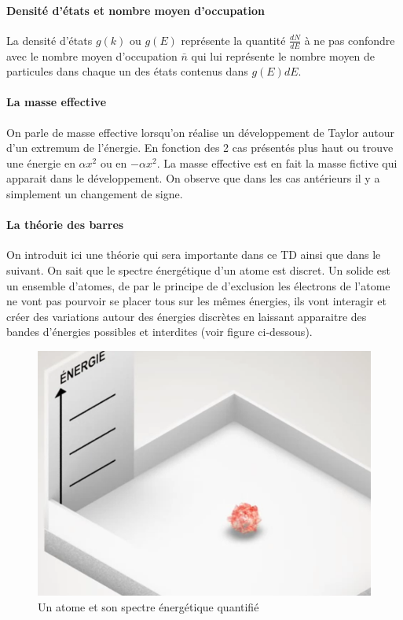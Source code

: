 \paragraph{Densité d'états et nombre moyen d'occupation}

La densité d'états $g(k)$ ou $g(E)$ représente la quantité $\frac{dN}{dE}$ à ne pas confondre avec le nombre moyen d'occupation $\bar{n}$ qui lui représente le nombre moyen de particules dans chaque un des états contenus dans $g(E)dE$.


\paragraph{La masse effective}

On parle de masse effective lorsqu'on réalise un développement de Taylor autour d'un extremum de l'énergie. En fonction des 2 cas présentés plus haut ou trouve une énergie en $\alpha x^2$ ou en 
$-\alpha x^2$. La masse effective est en fait la masse fictive qui apparait dans le développement. On observe que dans les cas antérieurs il y a simplement un changement de signe.


\paragraph{La théorie des barres}

On introduit ici une théorie qui sera importante dans ce TD ainsi que dans le suivant. On sait que le spectre énergétique d'un atome est discret. Un solide est un ensemble d'atomes, de par le principe de d'exclusion les électrons de l'atome ne vont pas pourvoir se placer tous sur les mêmes énergies, ils vont interagir et créer des variations autour des énergies discrètes en laissant apparaitre des bandes d'énergies possibles et interdites (voir figure ci-dessous).

\begin{figure}[H]
	\begin{center}
		\includegraphics[scale=0.2]{./img/IM5}
		\caption{Un atome et son spectre énergétique quantifié}
	\end{center}
\end{figure}

